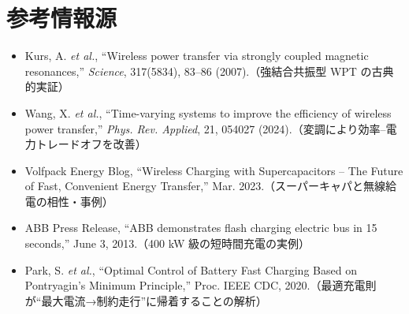 \documentclass[11pt]{ctexart}
\begin{document}
\section*{参考情報源}
\begin{itemize}
  \item Kurs, A. \emph{et al.}, ``Wireless power transfer via strongly coupled magnetic resonances,'' \emph{Science}, 317(5834), 83--86 (2007).（強結合共振型 WPT の古典的実証）
  \item Wang, X. \emph{et al.}, ``Time-varying systems to improve the efficiency of wireless power transfer,'' \emph{Phys. Rev. Applied}, 21, 054027 (2024).（変調により効率--電力トレードオフを改善）
  \item Volfpack Energy Blog, ``Wireless Charging with Supercapacitors -- The Future of Fast, Convenient Energy Transfer,'' Mar. 2023.（スーパーキャパと無線給電の相性・事例）
  \item ABB Press Release, ``ABB demonstrates flash charging electric bus in 15 seconds,'' June 3, 2013.（400 kW 級の短時間充電の実例）
  \item Park, S. \emph{et al.}, ``Optimal Control of Battery Fast Charging Based on Pontryagin's Minimum Principle,'' Proc. IEEE CDC, 2020.（最適充電則が“最大電流→制約走行”に帰着することの解析）
\end{itemize}
\end{document}
